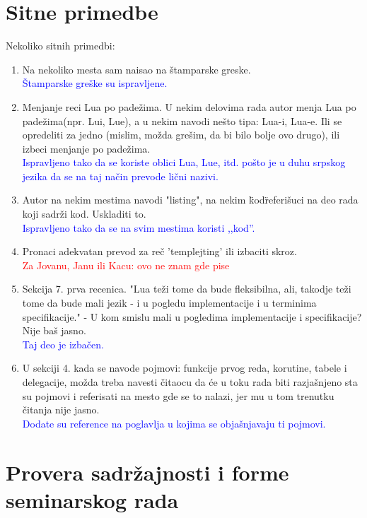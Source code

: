 \documentclass[a4paper]{report}
\newcommand{\odgovorAutora}[1]{\textcolor{blue}{#1}}
\newcommand{\note}[1]{\textcolor{red}{#1}}
\begin{document}
\section{Sitne primedbe}
Nekoliko sitnih primedbi:
\begin{enumerate}
  \item Na nekoliko mesta sam naisao na \v stamparske greske. \\
  \odgovorAutora{Štamparske greške su ispravljene.}
  \item Menjanje reci Lua po pade\v zima. U nekim delovima rada autor menja Lua po pade\v zima(npr. Lui, Lue), a u nekim navodi ne\v sto tipa: Lua-i, Lua-e. Ili se opredeliti za jedno (mislim, mo\v zda gre\v sim, da bi bilo bolje ovo drugo), ili izbeci menjanje po pade\v zima. \\
  \odgovorAutora{Ispravljeno tako da se koriste oblici Lua, Lue, itd. pošto je u duhu srpskog jezika da se na taj način prevode lični nazivi.}
  \item Autor na nekim mestima navodi "listing", na nekim \"kod\"  referi\v suci na deo rada koji sadr\v zi kod. Uskladiti to. \\
  \odgovorAutora{Ispravljeno tako da se na svim mestima koristi ,,kod''.}
  \item Pronaci adekvatan prevod za re\v c 'templejting'  ili izbaciti skroz. \\
  \note{Za Jovanu, Janu ili Kacu: ovo ne znam gde pise}
  \item Sekcija 7. prva recenica. "Lua te\v zi tome da bude fleksibilna, ali, takodje te\v zi tome da bude mali
jezik - i u pogledu implementacije i u terminima specifikacije." - U kom smislu mali u pogledima implementacije i specifikacije? Nije ba\v s jasno. \\
  \odgovorAutora{Taj deo je izbačen.}
  \item U sekciji 4. kada se navode pojmovi: funkcije prvog reda, korutine, tabele i delegacije, mo\v zda treba navesti \v citaocu da \' ce u toku rada biti razja\v snjeno sta su pojmovi i referisati na mesto gde se to nalazi, jer mu u tom trenutku \v citanja nije jasno. \\
  \odgovorAutora{Dodate su reference na poglavlja u kojima se objašnjavaju ti pojmovi.}

\end{enumerate}


\section{Provera sadržajnosti i forme seminarskog rada}
\end{document}

